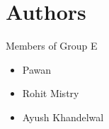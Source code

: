 \documentclass{article}
\begin{document}
\section*{Authors}
 Members of Group E
\begin{itemize}
	\item Pawan 
	\item Rohit Mistry
	\item Ayush Khandelwal
	
\end{itemize}
\end{document}

